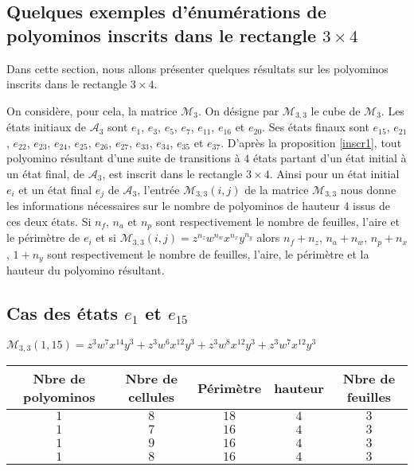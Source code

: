 \documentclass[12pt]{memoireuqam1.3}
\begin{document}
\normalsize
 \begin{spacing}{0.30}
\section*{Quelques exemples d'énumérations de polyominos inscrits dans le rectangle $3 \times 4$ }
 \end{spacing}
Dans  cette section, nous allons présenter quelques résultats sur les polyominos inscrits dans le rectangle $3 \times 4$. 

On considère, pour cela, la matrice $\mathcal{M}_{3}$. On désigne par $\mathcal{M}_{3,3}$ le cube de $\mathcal{M}_{3}$. Les états initiaux de $\mathcal{A}_{3}$ sont $e_{1}$, $e_{3}$, $e_{5}$, $e_{7}$, $e_{11}$, $e_{16}$ et $e_{20}$. Ses états finaux sont $e_{15}$, $e_{21}$, $e_{22}$, $e_{23}$, $e_{24}$, $e_{25}$, $e_{26}$, $e_{27}$, $e_{33}$, $e_{34}$, $e_{35}$ et $e_{37}$. D'après la proposition \ref{inscr1}, tout polyomino résultant d’une suite de transitions à $4$ états partant d’un état initial à un état final, de $\mathcal{A}_{3}$, est inscrit dans le rectangle $3\times 4$. Ainsi pour un état initial $e_{i}$ et un état final $e_{j}$ de $\mathcal{A}_{3}$, l'entrée $\mathcal{M}_{3,3}(i,j)$ de la matrice $\mathcal{M}_{3,3}$ nous donne les informations nécessaires sur le nombre de polyominos de hauteur $4$ issus de ces deux états. Si $n_{f}$, $n_{a}$ et $n_{p}$ sont respectivement le nombre de feuilles, l'aire et le périmètre de $e_{i}$ et si $\mathcal{M}_{3,3}(i,j)=z^{n_{z}}w^{n_{w}}x^{n_{x}}y^{n_{y}}$ alors 
$n_{f} +n_{z}$, $n_{a}+n_{w}$, $n_{p} + n_{x}$, $1+n_{y}$ sont respectivement le nombre de feuilles, l'aire, le périmètre et la hauteur du polyomino résultant.
 \begin{spacing}{0.30}
\subsection*{Cas des états $e_{1}$ et $e_{15}$ }
 \end{spacing}
$\mathcal{M}_{3,3}(1,15)=z^3w^7x^{14}y^3+z^3w^6x^{12}y^3+z^3w^8x^{12}y^3+z^3w^7x^{12}y^3$\\
\begin{tabular}{|c|c|c|c|c|}
 \hline
  Nbre de polyominos & Nbre de cellules & Périmètre & hauteur &Nbre de feuilles\\
 \hline
 $1$ & $8$ & $18$ & $4$ &$3$\\
 \hline
 $1$ & $7$ & $16$ & $4$ &$3$\\
 \hline
  $1$ & $9$ & $16$ & $4$ &$3$\\
 \hline
 $1$ & $8$ & $16$ & $4$ &$3$\\
 \hline
\end{tabular}
\end{document}
